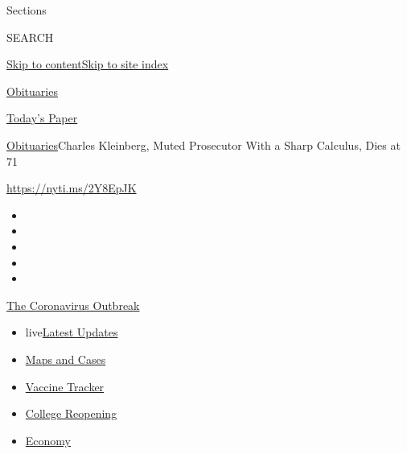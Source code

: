 Sections

SEARCH

\protect\hyperlink{site-content}{Skip to
content}\protect\hyperlink{site-index}{Skip to site index}

\href{https://www.nytimes3xbfgragh.onion/section/obituaries}{Obituaries}

\href{https://myaccount.nytimes3xbfgragh.onion/auth/login?response_type=cookie\&client_id=vi}{}

\href{https://www.nytimes3xbfgragh.onion/section/todayspaper}{Today's
Paper}

\href{/section/obituaries}{Obituaries}\textbar{}Charles Kleinberg, Muted
Prosecutor With a Sharp Calculus, Dies at 71

\url{https://nyti.ms/2Y8EpJK}

\begin{itemize}
\item
\item
\item
\item
\item
\end{itemize}

\href{https://www.nytimes3xbfgragh.onion/news-event/coronavirus?action=click\&pgtype=Article\&state=default\&region=TOP_BANNER\&context=storylines_menu}{The
Coronavirus Outbreak}

\begin{itemize}
\tightlist
\item
  live\href{https://www.nytimes3xbfgragh.onion/2020/08/04/world/coronavirus-covid-19.html?action=click\&pgtype=Article\&state=default\&region=TOP_BANNER\&context=storylines_menu}{Latest
  Updates}
\item
  \href{https://www.nytimes3xbfgragh.onion/interactive/2020/us/coronavirus-us-cases.html?action=click\&pgtype=Article\&state=default\&region=TOP_BANNER\&context=storylines_menu}{Maps
  and Cases}
\item
  \href{https://www.nytimes3xbfgragh.onion/interactive/2020/science/coronavirus-vaccine-tracker.html?action=click\&pgtype=Article\&state=default\&region=TOP_BANNER\&context=storylines_menu}{Vaccine
  Tracker}
\item
  \href{https://www.nytimes3xbfgragh.onion/2020/08/02/us/covid-college-reopening.html?action=click\&pgtype=Article\&state=default\&region=TOP_BANNER\&context=storylines_menu}{College
  Reopening}
\item
  \href{https://www.nytimes3xbfgragh.onion/live/2020/08/03/business/stock-market-today-coronavirus?action=click\&pgtype=Article\&state=default\&region=TOP_BANNER\&context=storylines_menu}{Economy}
\end{itemize}

